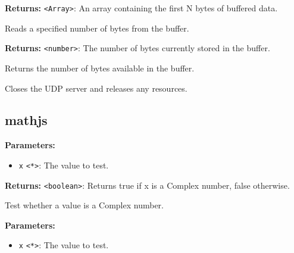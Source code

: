 \documentclass[12pt,a4paper]{article}
\begin{document}
\noindent \textbf{Returns:} \texttt{<Array>}: An array containing the first N bytes of buffered data.

\noindent Reads a specified number of bytes from the buffer.

\vspace{5mm}
\noindent {}


\noindent \textbf{Returns:} \texttt{<number>}: The number of bytes currently stored in the buffer.

\noindent Returns the number of bytes available in the buffer.

\vspace{5mm}
\noindent {}


\noindent Closes the UDP server and releases any resources.


\subsection{mathjs}
\vspace{5mm}
\noindent {}


\noindent \textbf{Parameters:}
\begin{itemize}
  \item \texttt{x} \texttt{<*>}: The value to test.
\end{itemize}

\noindent \textbf{Returns:} \texttt{<boolean>}: Returns true if \textasciigrave{}x\textasciigrave{} is a Complex number, false otherwise.

\noindent Test whether a value is a Complex number.

\vspace{5mm}
\noindent {}


\noindent \textbf{Parameters:}
\begin{itemize}
  \item \texttt{x} \texttt{<*>}: The value to test.
\end{itemize}
\end{document}
